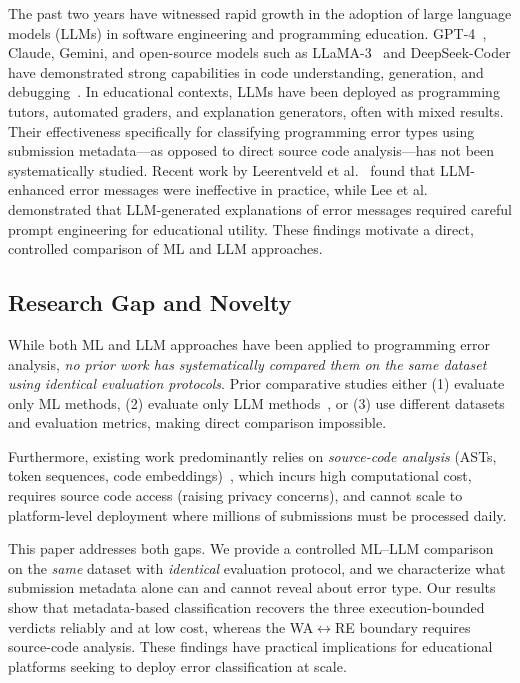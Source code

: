\documentclass[acmsmall]{acmart}
\begin{document}
The past two years have witnessed rapid growth in the adoption of large
language models (LLMs) in software engineering and programming education.
GPT-4~\cite{openai2024gpt4}, Claude, Gemini, and open-source models such as
LLaMA-3~\cite{dubey2024llama} and DeepSeek-Coder have demonstrated strong
capabilities in code understanding, generation, and
debugging~\cite{raihan2025large,zamfirescu2023what,prather2024code,
kazemitabaar2024impact}. In educational contexts, LLMs have been deployed as
programming tutors, automated graders, and explanation generators, often with
mixed results. Their effectiveness specifically for classifying
programming error types using submission metadata---as opposed to direct
source code analysis---has not been systematically studied. Recent work by
Leerentveld et al.~\cite{leerentveld2024not}
found that LLM-enhanced error messages were ineffective in practice,
while Lee et al.~\cite{lee2024code}
demonstrated that LLM-generated explanations of error messages required
careful prompt engineering for educational utility. These findings
motivate a direct, controlled comparison of ML and LLM approaches.

\subsection*{Research Gap and Novelty}

While both ML and LLM approaches have been applied to programming error
analysis, \textit{no prior work has systematically compared them on the same
dataset using identical evaluation protocols}. Prior comparative studies either
(1) evaluate only ML methods,
(2) evaluate only LLM methods~\cite{raihan2025large,zamfirescu2023what},
or (3) use different datasets and evaluation metrics, making direct comparison
impossible.

Furthermore, existing work predominantly relies on \textit{source-code
analysis} (ASTs, token sequences, code
embeddings)~\cite{wang2017learning,feng2020codebert}, which incurs high
computational cost, requires source code access (raising privacy concerns),
and cannot scale to platform-level deployment where millions of submissions
must be processed daily.

This paper addresses both gaps. We provide a controlled ML--LLM comparison
on the \emph{same} dataset with \emph{identical} evaluation protocol, and we
characterize what submission metadata alone can and cannot reveal about error
type. Our results show that metadata-based classification recovers the three
execution-bounded verdicts reliably and at low cost, whereas the
WA$\leftrightarrow$RE boundary requires source-code analysis. These findings
have practical implications for educational platforms seeking to deploy error
classification at scale.
\end{document}
